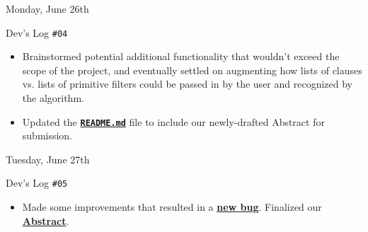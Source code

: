 \documentclass[11pt]{article}
\begin{document}
\normalsize\begin{leafgreenbox}{Monday, June 26th\vspace{-2.2em}\begin{flushright}Dev's Log \texttt{\#04}\hspace{0.5cm}\end{flushright}}
    \begin{itemize}         
        \item Brainstormed potential additional functionality that wouldn't exceed the scope of the project, and eventually settled on augmenting how lists of clauses vs. lists of primitive filters could be passed in by the user and recognized by the algorithm.
        \vspace{-0.25em}
        \item Updated the \href{https://github.com/usnistgov/ngpac/commit/594b40f05bf13d7824e076ca4f5457183e0db38d}{\textbf{\texttt{README.md}}} file to include our newly-drafted Abstract for submission.
    \end{itemize}
\end{leafgreenbox}

\begin{center}
    \vspace{-0.25em}
    \hspace{0.2cm}
    \vspace{-0.4em}
\end{center}

\normalsize\begin{leafgreenbox}{Tuesday, June 27th\vspace{-2.2em}\begin{flushright}Dev's Log \texttt{\#05}\hspace{0.5cm}\end{flushright}}
    \begin{itemize}         
        \item Made some improvements that resulted in a \href{https://github.com/usnistgov/ngpac/commit/70ece0fe6d537e2e63d131ab03440d1135f0557f}{\textbf{new bug}}. Finalized our \hyperlink{page.1}{\textbf{Abstract}}.
    \end{itemize}
\end{leafgreenbox}

\begin{center}
    \vspace{-0.25em}
    \hspace{0.2cm}
    \vspace{-0.4em}
\end{center}
\end{document}
